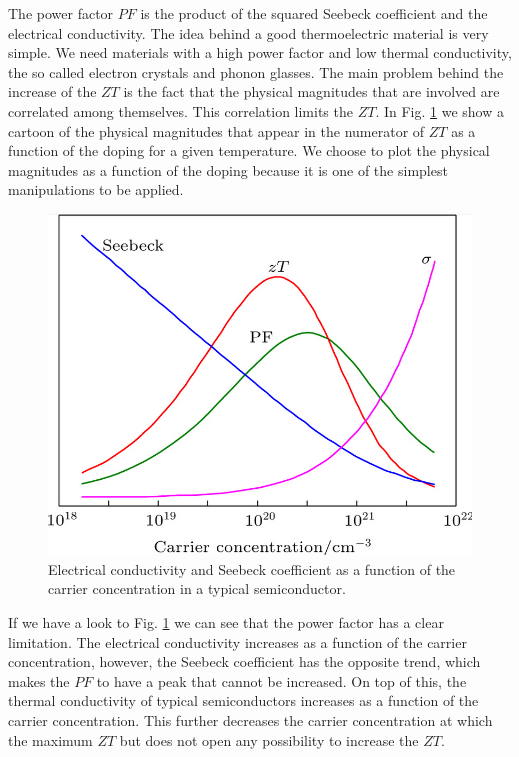 The power factor $PF$ is the product of the squared Seebeck coefficient and the electrical conductivity. The idea
behind a good thermoelectric material is very simple. We need materials with a high power factor and low thermal
conductivity, the so called electron crystals and phonon glasses. The main problem behind the increase of the $ZT$ 
is the fact that the physical magnitudes that are involved are correlated among themselves. This correlation limits 
the $ZT$. In Fig. \ref{decouple} we show a cartoon of the physical magnitudes that appear in the numerator of $ZT$ 
as a function of the doping for a given temperature. We choose to plot the physical magnitudes as a function of the
doping because it is one of the simplest manipulations to be applied. 
\begin{figure}[h]
\begin{center}
\includegraphics[width=0.8\linewidth]{Figures/decoupling.png}
\caption[Thermoelectric physical magnitudes]{Electrical conductivity and  Seebeck coefficient as a function of the 
carrier concentration in a typical semiconductor.}
\label{decouple}
\end{center}
\end{figure}
If we have a look to Fig. \ref{decouple} we can see that the power factor has a clear limitation. The electrical 
conductivity increases as a function of the carrier concentration, however, the Seebeck coefficient has the opposite 
trend, which makes the $PF$ to have a peak that cannot be increased. On top of this, the thermal conductivity of 
typical semiconductors increases as a function of the carrier concentration. This further decreases the carrier 
concentration at which the maximum $ZT$ but does not open any possibility to increase the $ZT$. \\


